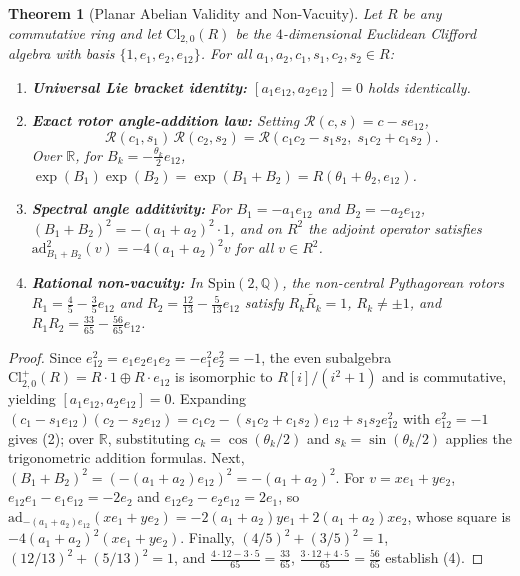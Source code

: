 \documentclass[11pt]{article}
\newtheorem{theorem}{Theorem}[section]
\theoremstyle{definition}
\newcommand{\Cl}{\mathrm{Cl}}
\newcommand{\Spin}{\mathrm{Spin}}
\newcommand{\ad}{\mathrm{ad}}
\newcommand{\rev}[1]{\widetilde{#1}}
\begin{document}
\begin{theorem}[Planar Abelian Validity and Non-Vacuity]\label{thm:n2}
Let $R$ be any commutative ring and let $\Cl_{2,0}(R)$ be the $4$-dimensional Euclidean
Clifford algebra with basis $\{1, e_1, e_2, e_{12}\}$. For all $a_1, a_2, c_1, s_1, c_2, s_2 \in R$:
\begin{enumerate}
  \item \textbf{Universal Lie bracket identity:} $[a_1 e_{12}, a_2 e_{12}] = 0$ holds identically.
  \item \textbf{Exact rotor angle-addition law:} Setting $\mathcal{R}(c,s) = c - s e_{12}$,
    \begin{equation}
      \mathcal{R}(c_1, s_1)\,\mathcal{R}(c_2, s_2)
      = \mathcal{R}(c_1 c_2 - s_1 s_2,\; s_1 c_2 + c_1 s_2).
    \end{equation}
    Over $\mathbb{R}$, for $B_k = -\frac{\theta_k}{2} e_{12}$, $\exp(B_1)\exp(B_2) =
    \exp(B_1 + B_2) = R(\theta_1 + \theta_2, e_{12})$.
  \item \textbf{Spectral angle additivity:} For $B_1 = -a_1 e_{12}$ and $B_2 = -a_2 e_{12}$,
    $(B_1 + B_2)^2 = -(a_1 + a_2)^2 \cdot 1$, and on $R^2$ the adjoint operator satisfies
    $\ad_{B_1 + B_2}^2(v) = -4(a_1 + a_2)^2 v$ for all $v \in R^2$.
  \item \textbf{Rational non-vacuity:} In $\Spin(2, \mathbb{Q})$, the non-central Pythagorean
    rotors $R_1 = \frac{4}{5} - \frac{3}{5}e_{12}$ and $R_2 = \frac{12}{13} - \frac{5}{13}e_{12}$
    satisfy $R_k \rev{R_k} = 1$, $R_k \neq \pm 1$, and $R_1 R_2 = \frac{33}{65} - \frac{56}{65}e_{12}$.
\end{enumerate}
\end{theorem}

\begin{proof}
Since $e_{12}^2 = e_1 e_2 e_1 e_2 = -e_1^2 e_2^2 = -1$, the even subalgebra
$\Cl_{2,0}^+(R) = R \cdot 1 \oplus R \cdot e_{12}$ is isomorphic to $R[i]/(i^2 + 1)$ and is
commutative, yielding $[a_1 e_{12}, a_2 e_{12}] = 0$. Expanding
$(c_1 - s_1 e_{12})(c_2 - s_2 e_{12}) = c_1 c_2 - (s_1 c_2 + c_1 s_2)e_{12} + s_1 s_2 e_{12}^2$
with $e_{12}^2 = -1$ gives (2); over $\mathbb{R}$, substituting $c_k = \cos(\theta_k/2)$ and
$s_k = \sin(\theta_k/2)$ applies the trigonometric addition formulas. Next,
$(B_1 + B_2)^2 = (-(a_1 + a_2)e_{12})^2 = -(a_1 + a_2)^2$. For $v = x e_1 + y e_2$,
$e_{12} e_1 - e_1 e_{12} = -2 e_2$ and $e_{12} e_2 - e_2 e_{12} = 2 e_1$, so
$\ad_{-(a_1+a_2)e_{12}}(x e_1 + y e_2) = -2(a_1 + a_2) y e_1 + 2(a_1 + a_2) x e_2$, whose square
is $-4(a_1 + a_2)^2 (x e_1 + y e_2)$. Finally, $(4/5)^2 + (3/5)^2 = 1$,
$(12/13)^2 + (5/13)^2 = 1$, and $\frac{4\cdot 12 - 3\cdot 5}{65} = \frac{33}{65}$,
$\frac{3\cdot 12 + 4\cdot 5}{65} = \frac{56}{65}$ establish (4).
\end{proof}
\end{document}

